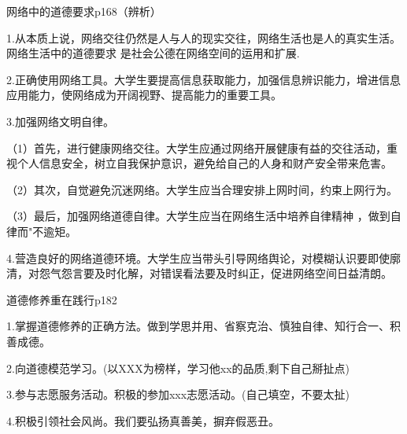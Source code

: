 \documentclass[lang=cn,10pt]{elegantbook}
\begin{document}
	\begin{example}
		网络中的道德要求p168（辨析）
	\end{example}
	\begin{solution}
		
		1.从本质上说，网络交往仍然是人与人的现实交往，网络生活也是人的真实生活。网络生活中的道德要求 是社会公德在网络空间的运用和扩展.
		
		2.正确使用网络工具。大学生要提高信息获取能力，加强信息辨识能力，增进信息应用能力，使网络成为开阔视野、提高能力的重要工具。
		
		3.加强网络文明自律。
		
		（1）首先，进行健康网络交往。大学生应通过网络开展健康有益的交往活动，重视个人信息安全，树立自我保护意识，避免给自己的人身和财产安全带来危害。
		
		（2）其次，自觉避免沉迷网络。大学生应当合理安排上网时间，约束上网行为。
		
		（3）最后，加强网络道德自律。大学生应当在网络生活中培养自律精神 ，做到自律而"不逾矩。
		
		4.营造良好的网络道德环境。大学生应当带头引导网络舆论，对模糊认识要即使廓清，对怨气怨言要及时化解，对错误看法要及时纠正，促进网络空间日益清朗。
	\end{solution}
	\begin{example}
		道德修养重在践行p182
	\end{example}
	\begin{solution}
		
		1.掌握道德修养的正确方法。做到学思并用、省察克治、慎独自律、知行合一、积善成德。
		
		2.向道德模范学习。(以XXX为榜样，学习他xx的品质,剩下自己掰扯点)
		
		3.参与志愿服务活动。积极的参加xxx志愿活动。(自己填空，不要太扯)
		
		4.积极引领社会风尚。我们要弘扬真善美，摒弃假恶丑。
	\end{solution}
\end{document}
